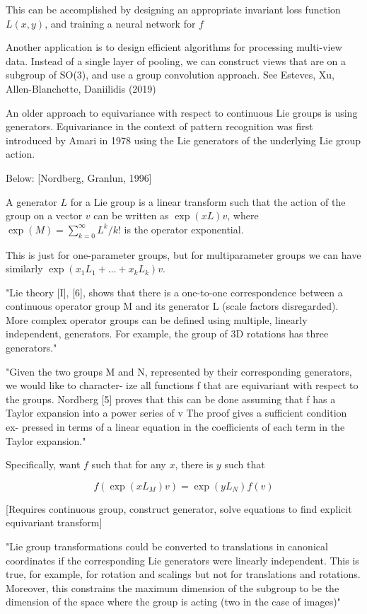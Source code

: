 \documentclass[english]{article}
\begin{document}
This can be accomplished by designing an appropriate invariant loss function $L(x,y)$, and training a neural network for $f$

\item Another application is to design efficient algorithms for processing multi-view data. Instead of a single layer of pooling, we can construct views that are on a subgroup of SO(3), and use a group convolution approach. See Esteves, Xu, Allen-Blanchette, Daniilidis (2019)

\item An older approach to equivariance with respect to continuous Lie groups is using generators. Equivariance in the context of pattern recognition was first introduced by Amari in 1978 using the Lie generators
of the underlying Lie group action.


Below: [Nordberg, Granlun, 1996]

A generator $L$ for a Lie group is a linear transform such that the action of the group on a vector $v$ can be written as $\exp(xL)v$, where $\exp(M) = \sum_{k=0}^\infty L^k/k!$ is the operator exponential. 

This is just for one-parameter groups, but for multiparameter groups we can have similarly $\exp(x_1L_1+\ldots+x_k L_k)v$.

"Lie theory [I], [6], shows that there is a one-to-one correspondence between a continuous operator group M
and its generator L (scale factors disregarded). More
complex operator groups can be defined using multiple, linearly independent, generators. For example, the
group of 3D rotations has three generators."

"Given the two groups M and N, represented by their
corresponding generators, we would like to character-
ize all functions f that are equivariant with respect to
the groups. Nordberg [5] proves that this can be done
assuming that f has a Taylor expansion into a power
series of v The proof gives a sufficient condition ex-
pressed in terms of a linear equation in the coefficients
of each term in the Taylor expansion."

Specifically, want $f$ such that for any $x$, there is $y$ such that

$$f(\exp(xL_M)v) = \exp(yL_N)f(v)$$

[Requires continuous group, construct generator, solve equations to find explicit equivariant transform]

"Lie group transformations could be converted to translations in
canonical coordinates if the corresponding Lie generators were linearly independent. This is true, for example, for rotation and scalings but not for translations and rotations. Moreover, this constrains the maximum
dimension of the subgroup to be the dimension of the space where the group is acting (two in the case of images)"
\end{document}
